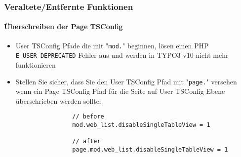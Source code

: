 
\begin{frame}[fragile]
	\frametitle{Veraltete/Entfernte Funktionen}
	\framesubtitle{Überschreiben der Page TSConfig}

	\lstset{basicstyle=\smaller\ttfamily}

	\begin{itemize}
		\item User TSConfig Pfade die mit "\texttt{mod.}" beginnen, lösen einen PHP
			\texttt{E\_USER\_DEPRECATED} Fehler aus und werden in TYPO3 v10 nicht mehr funktionieren
		\item Stellen Sie sicher, dass Sie den User TSConfig Pfad mit "\texttt{page.}" versehen
			wenn ein Page TSConfig Pfad für die Seite auf User TSConfig Ebene überschrieben werden 
			sollte:

			\begin{lstlisting}
				// before
				mod.web_list.disableSingleTableView = 1

				// after
				page.mod.web_list.disableSingleTableView = 1
			\end{lstlisting}

	\end{itemize}

\end{frame}


